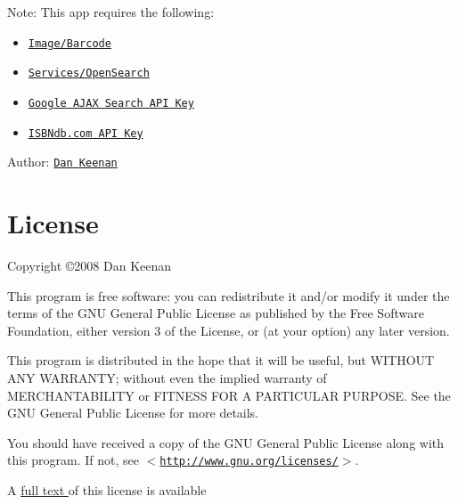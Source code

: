 \begin{Desc}
\item[Note:]This app requires the following:\begin{itemize}
\item \href{http://pear.php.net/package/Image_Barcode/}{\tt Image/Barcode}\item \href{http://pear.php.net/package/Services_OpenSearch/}{\tt Services/OpenSearch}\item \href{http://code.google.com/apis/ajaxsearch/signup.html}{\tt Google AJAX Search API Key}\item \href{https://isbndb.com/account/dev/keys/}{\tt ISBNdb.com API Key}\end{itemize}
\end{Desc}
\begin{Desc}
\item[Author:]\href{http://dankeenan.org}{\tt Dan Keenan} \end{Desc}
\hypertarget{index_license}{}\section{License}\label{index_license}
Copyright \copyright 2008 Dan Keenan

This program is free software: you can redistribute it and/or modify it under the terms of the GNU General Public License as published by the Free Software Foundation, either version 3 of the License, or (at your option) any later version.

This program is distributed in the hope that it will be useful, but WITHOUT ANY WARRANTY; without even the implied warranty of MERCHANTABILITY or FITNESS FOR A PARTICULAR PURPOSE. See the GNU General Public License for more details.

You should have received a copy of the GNU General Public License along with this program. If not, see $<$\href{http://www.gnu.org/licenses/}{\tt http://www.gnu.org/licenses/}$>$.



A \hyperlink{license}{full text } of this license is available 